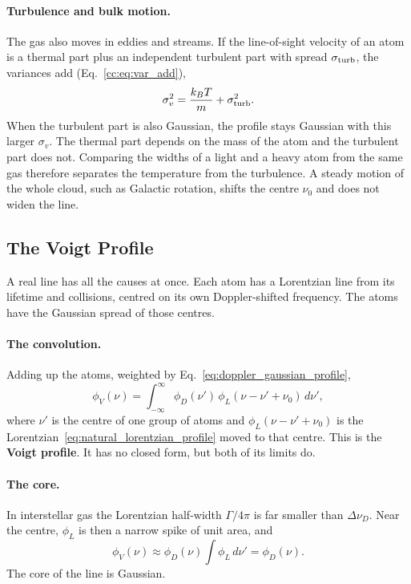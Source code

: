 \paragraph{Turbulence and bulk motion.} The gas also moves in eddies and streams. If the line-of-sight velocity of an atom is a thermal part plus an independent turbulent part with spread $\sigma_{\rm turb}$, the variances add (Eq.~\eqref{cc:eq:var_add}),
\[
\sigma_v^2=\frac{k_BT}{m}+\sigma_{\rm turb}^2 .
\]
When the turbulent part is also Gaussian, the profile stays Gaussian with this larger $\sigma_v$. The thermal part depends on the mass of the atom and the turbulent part does not. Comparing the widths of a light and a heavy atom from the same gas therefore separates the temperature from the turbulence. A steady motion of the whole cloud, such as Galactic rotation, shifts the centre $\nu_0$ and does not widen the line.

\subsection{The Voigt Profile}

A real line has all the causes at once. Each atom has a Lorentzian line from its lifetime and collisions, centred on its own Doppler-shifted frequency. The atoms have the Gaussian spread of those centres.

\paragraph{The convolution.} Adding up the atoms, weighted by Eq.~\eqref{eq:doppler_gaussian_profile},
\begin{equation}
	\boxed{\phi_V(\nu)=\int_{-\infty}^{\infty}\phi_D(\nu')\,\phi_L(\nu-\nu'+\nu_0)\,d\nu',}
	\label{is:eq:voigt}
\end{equation}
where $\nu'$ is the centre of one group of atoms and $\phi_L(\nu-\nu'+\nu_0)$ is the Lorentzian~\eqref{eq:natural_lorentzian_profile} moved to that centre. This is the \textbf{Voigt profile}. It has no closed form, but both of its limits do.

\paragraph{The core.} In interstellar gas the Lorentzian half-width $\Gamma/4\pi$ is far smaller than $\Delta\nu_D$. Near the centre, $\phi_L$ is then a narrow spike of unit area, and
\[
\phi_V(\nu)\approx\phi_D(\nu)\int\phi_L\,d\nu'=\phi_D(\nu).
\]
The core of the line is Gaussian.

